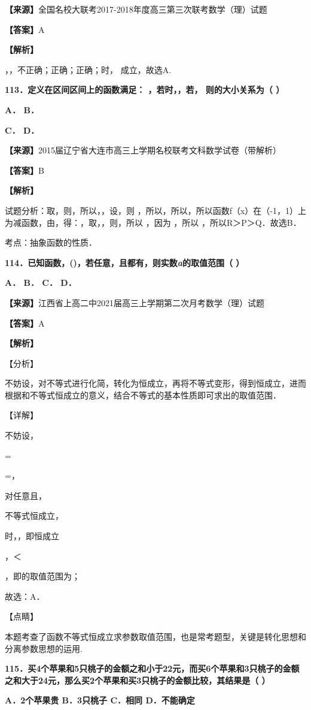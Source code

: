\textbf{【来源】}全国名校大联考2017-2018年度高三第三次联考数学（理）试题

\textbf{【答案】}A

\textbf{【解析】}

，，不正确；正确；正确；时， 成立，故选A.

\textbf{113．定义在区间区间上的函数满足： ，若时，，若，
则的大小关系为（ ）}

\textbf{A． B．}

\textbf{C． D．}

\textbf{【来源】}2015届辽宁省大连市高三上学期名校联考文科数学试卷（带解析）

\textbf{【答案】}B

\textbf{【解析】}

试题分析：取，则，所以，，设，则
，所以，所以，所以函数f（x）在（-1，1）上为减函数，由，得：，取，，则，所以
，因为 ，所以 ，所以R＞P＞Q．故选B．

考点：抽象函数的性质．

\textbf{114．已知函数，()，若任意，且都有，则实数\emph{a}的取值范围（
）}

\textbf{A． B． C． D．}

\textbf{【来源】}江西省上高二中2021届高三上学期第二次月考数学（理）试题

\textbf{【答案】}A

\textbf{【解析】}

【分析】

不妨设，对不等式进行化简，转化为恒成立，再将不等式变形，得到恒成立，进而根据和不等式恒成立的意义，结合不等式的基本性质即可求出的取值范围．

【详解】

不妨设，

=

=，

对任意且，

不等式恒成立，

时，，即恒成立

，＜

，即的取值范围为；

故选：A．

【点睛】

本题考查了函数不等式恒成立求参数取值范围，也是常考题型，关键是转化思想和分离参数思想的运用.

\textbf{115．买4个苹果和5只桃子的金额之和小于22元，而买6个苹果和3只桃子的金额之和大于24元，那么买2个苹果和买3只桃子的金额比较，其结果是（
）}

\textbf{A．2个苹果贵 B．3只桃子 C．相同 D．不能确定}

